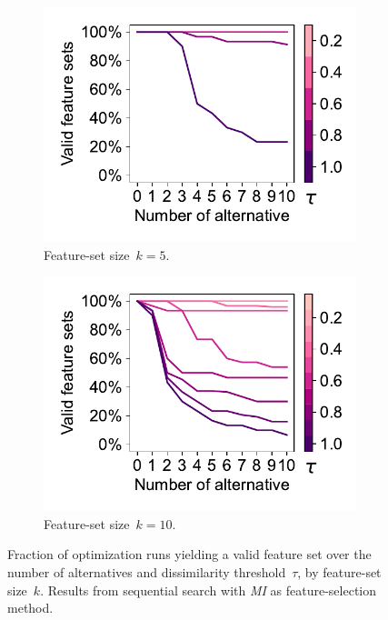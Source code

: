 \documentclass{article}
\theoremstyle{definition}
\begin{document}
\begin{figure}[t]
	\centering
	\begin{subfigure}[t]{0.48\textwidth}
		\centering
		\includegraphics[width=\textwidth, trim=15 15 10 15, clip]{plots/afs-impact-num-alternatives-tau-optimization-status-k-5.pdf}
		\caption{Feature-set size~$k=5$.}
		\label{fig:afs:impact-num-alternatives-tau-optimization-status-k-5}
	\end{subfigure}
	\hfill
	\begin{subfigure}[t]{0.48\textwidth}
		\centering
		\includegraphics[width=\textwidth, trim=15 15 10 15, clip]{plots/afs-impact-num-alternatives-tau-optimization-status-k-10.pdf}
		\caption{Feature-set size~$k=10$.}
		\label{fig:afs:impact-num-alternatives-tau-optimization-status-k-10}
	\end{subfigure}
	\caption{
		Fraction of optimization runs yielding a valid feature set over the number of alternatives and dissimilarity threshold~$\tau$, by feature-set size~$k$.
		Results from sequential search with \emph{MI} as feature-selection method.
	}
	\label{fig:afs:impact-num-alternatives-tau-optimization-status}
\end{figure}
\end{document}
